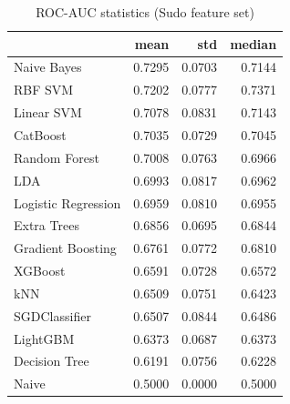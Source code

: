 \begin{table}
\caption{ROC-AUC statistics (Sudo feature set)}
\label{tab:roc-auc_Sudo_stats}
\begin{tabular}{lrrr}
\toprule
 & mean & std & median \\
\midrule
Naive Bayes & 0.7295 & 0.0703 & 0.7144 \\
RBF SVM & 0.7202 & 0.0777 & 0.7371 \\
Linear SVM & 0.7078 & 0.0831 & 0.7143 \\
CatBoost & 0.7035 & 0.0729 & 0.7045 \\
Random Forest & 0.7008 & 0.0763 & 0.6966 \\
LDA & 0.6993 & 0.0817 & 0.6962 \\
Logistic Regression & 0.6959 & 0.0810 & 0.6955 \\
Extra Trees & 0.6856 & 0.0695 & 0.6844 \\
Gradient Boosting & 0.6761 & 0.0772 & 0.6810 \\
XGBoost & 0.6591 & 0.0728 & 0.6572 \\
kNN & 0.6509 & 0.0751 & 0.6423 \\
SGDClassifier & 0.6507 & 0.0844 & 0.6486 \\
LightGBM & 0.6373 & 0.0687 & 0.6373 \\
Decision Tree & 0.6191 & 0.0756 & 0.6228 \\
Naive & 0.5000 & 0.0000 & 0.5000 \\
\bottomrule
\end{tabular}
\end{table}
